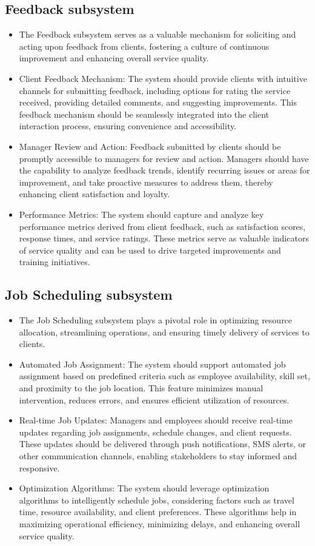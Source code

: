 \documentclass{article}
\begin{document}
\subsection*{Feedback subsystem}	
\begin{itemize}
    \item The Feedback subsystem serves as a valuable mechanism for soliciting and acting upon feedback from clients, fostering a culture of continuous improvement and enhancing overall service quality.
    \item Client Feedback Mechanism: The system should provide clients with intuitive channels for submitting feedback, including options for rating the service received, providing detailed comments, and suggesting improvements. This feedback mechanism should be seamlessly integrated into the client interaction process, ensuring convenience and accessibility.
    \item Manager Review and Action: Feedback submitted by clients should be promptly accessible to managers for review and action. Managers should have the capability to analyze feedback trends, identify recurring issues or areas for improvement, and take proactive measures to address them, thereby enhancing client satisfaction and loyalty.
    \item Performance Metrics: The system should capture and analyze key performance metrics derived from client feedback, such as satisfaction scores, response times, and service ratings. These metrics serve as valuable indicators of service quality and can be used to drive targeted improvements and training initiatives.
\end{itemize}
\subsection*{Job Scheduling subsystem}
\begin{itemize}
    \item The Job Scheduling subsystem plays a pivotal role in optimizing resource allocation, streamlining operations, and ensuring timely delivery of services to clients.
    \item Automated Job Assignment: The system should support automated job assignment based on predefined criteria such as employee availability, skill set, and proximity to the job location. This feature minimizes manual intervention, reduces errors, and ensures efficient utilization of resources.
    \item Real-time Job Updates: Managers and employees should receive real-time updates regarding job assignments, schedule changes, and client requests. These updates should be delivered through push notifications, SMS alerts, or other communication channels, enabling stakeholders to stay informed and responsive.
    \item Optimization Algorithms: The system should leverage optimization algorithms to intelligently schedule jobs, considering factors such as travel time, resource availability, and client preferences. These algorithms help in maximizing operational efficiency, minimizing delays, and enhancing overall service quality.
\end{itemize}
\end{document}
